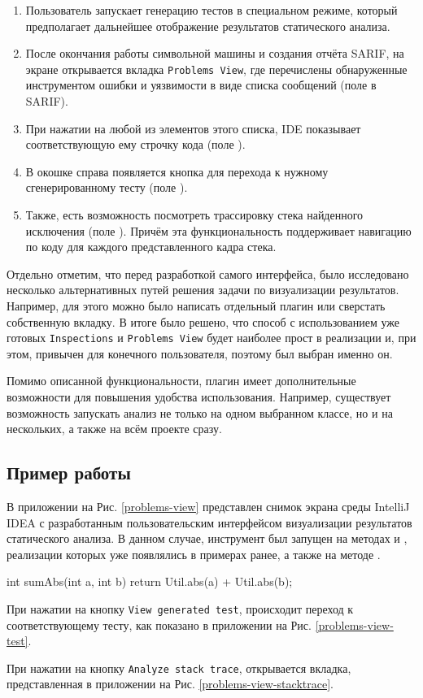 \begin{enumerate}
    \item Пользователь запускает генерацию тестов в специальном режиме, который предполагает дальнейшее отображение результатов статического анализа.
    \item После окончания работы символьной машины и создания отчёта SARIF, на экране открывается вкладка \verb|Problems View|, где перечислены обнаруженные инструментом ошибки и уязвимости в виде списка сообщений (поле  в SARIF).
    \item При нажатии на любой из элементов этого списка, IDE показывает соответствующую ему строчку кода (поле ).
    \item В окошке справа появляется кнопка для перехода к нужному сгенерированному тесту (поле ).
    \item Также, есть возможность посмотреть трассировку стека найденного исключения (поле ). Причём эта функциональность поддерживает навигацию по коду для каждого представленного кадра стека.
\end{enumerate}

Отдельно отметим, что перед разработкой самого интерфейса, было исследовано несколько альтернативных путей решения задачи по визуализации результатов. Например, для этого можно было написать отдельный плагин или сверстать собственную вкладку. В итоге было решено, что способ с использованием уже готовых \verb|Inspections| и \verb|Problems View| будет наиболее прост в реализации и, при этом, привычен для конечного пользователя, поэтому был выбран именно он.

Помимо описанной функциональности, плагин имеет дополнительные возможности для повышения удобства использования. Например, существует возможность запускать анализ не только на одном выбранном классе, но и на нескольких, а также на всём проекте сразу.

\subsection{Пример работы}

В приложении на Рис. \ref{problems-view} представлен снимок экрана среды IntelliJ IDEA с разработанным пользовательским интерфейсом визуализации результатов статического анализа. В данном случае, инструмент был запущен на методах  и , реализации которых уже появлялись в примерах ранее, а также на методе .

\begin{code}
int sumAbs(int a, int b) {
    return Util.abs(a) + Util.abs(b);
}
\end{code}

При нажатии на кнопку \verb|View generated test|, происходит переход к соответствующему тесту, как показано в приложении на Рис. \ref{problems-view-test}. 

При нажатии на кнопку \verb|Analyze stack trace|, открывается вкладка, представленная в приложении на Рис. \ref{problems-view-stacktrace}.
